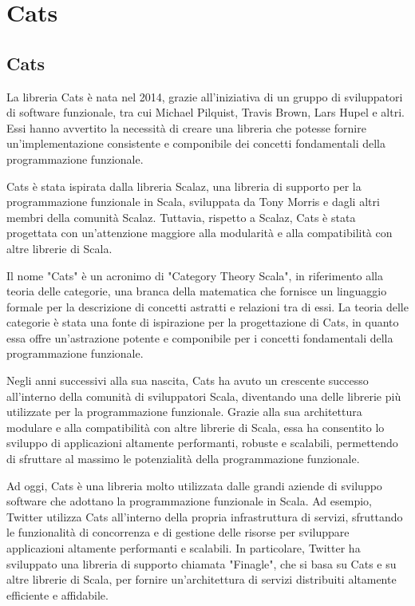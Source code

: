 \chapter{Cats}

\section{Cats}
La libreria Cats è nata nel 2014, grazie all'iniziativa di un gruppo di sviluppatori di software funzionale, tra cui Michael Pilquist, Travis Brown, Lars Hupel e altri. Essi hanno avvertito la necessità di creare una libreria che potesse fornire un'implementazione consistente e componibile dei concetti fondamentali della programmazione funzionale.

\noindent Cats è stata ispirata dalla libreria Scalaz, una libreria di supporto per la programmazione funzionale in Scala, sviluppata da Tony Morris e dagli altri membri della comunità Scalaz. Tuttavia, rispetto a Scalaz, Cats è stata progettata con un'attenzione maggiore alla modularità e alla compatibilità con altre librerie di Scala.

\noindent Il nome "Cats" è un acronimo di "Category Theory Scala", in riferimento alla teoria delle categorie, una branca della matematica che fornisce un linguaggio formale per la descrizione di concetti astratti e relazioni tra di essi. La teoria delle categorie è stata una fonte di ispirazione per la progettazione di Cats, in quanto essa offre un'astrazione potente e componibile per i concetti fondamentali della programmazione funzionale.

\noindent Negli anni successivi alla sua nascita, Cats ha avuto un crescente successo all'interno della comunità di sviluppatori Scala, diventando una delle librerie più utilizzate per la programmazione funzionale. Grazie alla sua architettura modulare e alla compatibilità con altre librerie di Scala, essa ha consentito lo sviluppo di applicazioni altamente performanti, robuste e scalabili, permettendo di sfruttare al massimo le potenzialità della programmazione funzionale.

\noindent Ad oggi, Cats è una libreria molto utilizzata dalle grandi aziende di sviluppo software che adottano la programmazione funzionale in Scala. Ad esempio, Twitter utilizza Cats all'interno della propria infrastruttura di servizi, sfruttando le funzionalità di concorrenza e di gestione delle risorse per sviluppare applicazioni altamente performanti e scalabili. In particolare, Twitter ha sviluppato una libreria di supporto chiamata "Finagle", che si basa su Cats e su altre librerie di Scala, per fornire un'architettura di servizi distribuiti altamente efficiente e affidabile.

